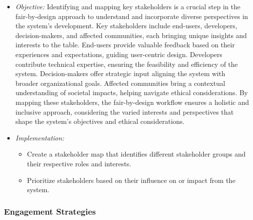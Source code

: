 \documentclass[12pt,a4paper,openright,twoside]{book}
\begin{document}
\begin{itemize}
    
    \item \emph{Objective:} Identifying and mapping key stakeholders is a crucial step in the fair-by-design approach to understand and incorporate diverse perspectives in the system's development. Key stakeholders include end-users, developers, decision-makers, and affected communities, each bringing unique insights and interests to the table. End-users provide valuable feedback based on their experiences and expectations, guiding user-centric design. Developers contribute technical expertise, ensuring the feasibility and efficiency of the system. Decision-makers offer strategic input aligning the system with broader organizational goals. Affected communities bring a contextual understanding of societal impacts, helping navigate ethical considerations. By mapping these stakeholders, the fair-by-design workflow ensures a holistic and inclusive approach, considering the varied interests and perspectives that shape the system's objectives and ethical considerations.
    
    \item \emph{Implementation:}
    
    \begin{itemize}
    
        \item Create a stakeholder map that identifies different stakeholder groups and their respective roles and interests.
    
        \item Prioritize stakeholders based on their influence on or impact from the system.
    
    \end{itemize}

\end{itemize}

\subsubsection{Engagement Strategies}
\end{document}
